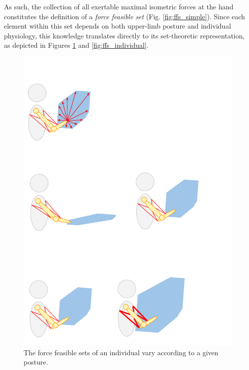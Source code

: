 As such, the collection of all exertable maximal isometric forces at the hand constitutes the definition of a \emph{force feasible set} (Fig. \ref{fig:ffs_simple}). Since each element within this set depends on both upper-limb posture and individual physiology, this knowledge translates directly to its set-theoretic representation, as depicted in Figures \ref{fig:ffs_posture} and \ref{fig:ffs_individual}.
\begin{figure}[!htb]
    \captionsetup{justification=centering}
        \centering
        \includegraphics[trim={0 200 40 200},clip,width=0.7\linewidth]{img/chapter_1/ffs_characteristics.pdf}
    \caption{The force feasible sets of an individual vary according to a given posture.}
    \label{fig:ffs_posture}
\end{figure}


